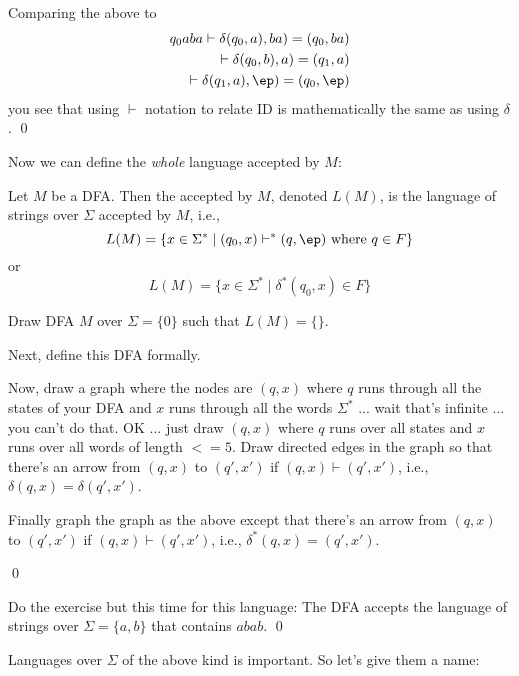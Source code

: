   Comparing the above to
    \begin{align*}
    q_0 aba
    \vdash \delta(q_0, a), ba) = (q_0, ba) \\ 
    \vdash \delta(q_0, b), a) = (q_1, a) \\
    \vdash \delta(q_1, a), \ep) = (q_0, \ep)
  \end{align*}
    you see that using $\vdash$ notation to relate
    ID is mathematically the same as
    using $\delta$.
    \qed
  
Now we can define the \textit{whole} language accepted by $M$:

\begin{defn} Let $M$ be a DFA. Then the  accepted by $M$,
denoted $L(M)$, is the language of strings over $\Sigma$ accepted
by $M$, i.e.,
\[
L(M) = \{x \in \Sigma^* \mid (q_0, x) \vdash^* (q, \ep) \text{ where } q \in F \}
\]
or
\[
L(M) = \{x \in \Sigma^* \mid \delta^* (q_0, x) \in F \}
\]
\end{defn}

\newpage
\begin{ex}
\begin{tightlist}
\item Draw DFA $M$ over $\Sigma = \{0\}$ such that $L(M) = \{\}$.
\item Next, define this DFA formally.
\item Now, draw a graph where the nodes are $(q, x)$ where
$q$ runs through all the states of your DFA and $x$
runs through all the words $\Sigma^*$ ... wait
that's infinite ... you can't do that.
OK ... just draw $(q, x)$ where $q$ runs over all states
and $x$ runs over all words of length $<= 5$.
Draw directed edges in the graph so that
there's an arrow from $(q,x)$ to $(q', x')$ if
$(q, x) \vdash (q', x')$, i.e., $\delta(q, x) = \delta(q', x')$.
\item Finally graph the graph as the above except that
there's an arrow from $(q, x)$ to $(q', x')$
if $(q, x) \vdash (q', x')$, i.e.,
$\delta^*(q, x) = (q', x')$.
\end{tightlist}
\qed
\end{ex}

\newpage
\begin{ex}
  Do the exercise but this time for this language:
  The DFA accepts the language of strings over 
  $\Sigma = \{a, b\}$ that contains $abab$.
  \qed
\end{ex}


\newpage
Languages over $\Sigma$ of the above kind is important.
So let's give them a name: 

